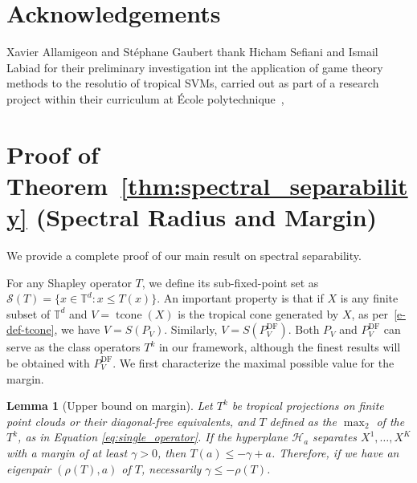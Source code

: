 \documentclass{article}
\newtheorem{lemma}[theorem]{Lemma}
\newcommand{\tcone}{\operatorname{tcone}}
\newcommand{\Pdiagfree}{P^{\text{DF}}}
\renewcommand{\leq}{\leqslant}
\newcommand{\trop}{\mathbb{T}}
\begin{document}
\section*{Acknowledgements}
Xavier Allamigeon and St\'ephane Gaubert thank Hicham Sefiani and Ismail Labiad
for their preliminary investigation int the application of game theory methods to the resolutio of tropical SVMs, carried out as part of a research project within their curriculum at \'Ecole polytechnique~\cite{labiadsefiani},





\newpage
\appendix
\section{Proof of Theorem~\ref{thm:spectral_separability} (Spectral Radius and Margin)}\label{appendix:proofs}
We provide a complete proof of our main result on spectral separability.

For any Shapley operator $T$, we define its sub-fixed-point
set as $\mathcal{S}(T) = \{x \in \trop^d : x \leq T(x)\}$.
An important property is that if $X$ is any finite subset of $\trop^d$
and $V=\tcone(X)$ is the tropical cone generated by $X$, as per~\eqref{e-def-tcone},
we have $V = S(P_V)$. Similarly, $V = S(P^{\text{DF}}_V)$.
Both $P_V$ and $\Pdiagfree_V$ 
can serve as the class operators $T^k$ in our framework,
although the finest results will be obtained with $\Pdiagfree_V$. 
We first characterize the maximal possible value for the margin.

\begin{lemma}[Upper bound on margin]\label{lemma:hyperplane_to_operator}
Let $T^k$ be tropical projections on finite point clouds or their diagonal-free equivalents, and $T$ defined as the $\operatorname{\max}_2$ of the $T^k$, as in Equation \ref{eq:single_operator}.
If the hyperplane $\mathcal{H}_a$ separates $X^1,\ldots,X^K$ with a margin of at least $\gamma > 0$, then $T(a) \leq -\gamma + a$.
Therefore, if we have an eigenpair $(\rho(T),a)$ of $T$, necessarily $\gamma \le -\rho(T)$.
\end{lemma}
\end{document}
